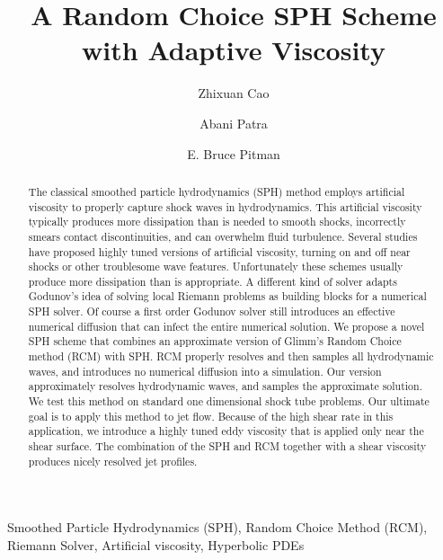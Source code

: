 \documentclass[review]{elsarticle}
\begin{document}
\begin{frontmatter}
\title{A Random Choice SPH Scheme with Adaptive Viscosity}
\author{Zhixuan Cao}
\author{Abani Patra }
\address{Department of Mechanical and Aerospace Engineering,The State University of New York at Buffalo, Amherst, NY, 14260-4200, USA}
\author{E. Bruce Pitman}
\address{Department of Materials Design and Innovation, The State University of New York at Buffalo, Amherst, NY, 14260-4200, USA}

\begin{abstract}
The classical smoothed particle hydrodynamics (SPH) method
employs artificial viscosity to properly capture shock waves in hydrodynamics. This artificial viscosity typically
produces more dissipation than is needed to smooth shocks, incorrectly  smears 
contact discontinuities, and can overwhelm fluid turbulence. 
Several studies have proposed highly tuned versions of artificial viscosity,
turning on and off near shocks or other troublesome wave features. 
Unfortunately these schemes usually produce more dissipation than is appropriate.
A different kind of solver adapts Godunov\rq{}s idea of solving local Riemann problems 
as building blocks for a numerical SPH solver. Of course a first order Godunov solver still introduces an effective numerical diffusion that can infect the entire numerical solution.
We propose a novel SPH scheme that combines an approximate
 version of Glimm\rq{}s Random Choice method (RCM)
with SPH. RCM properly resolves and then samples all hydrodynamic waves, and
introduces no numerical diffusion into a simulation. Our version approximately resolves
hydrodynamic waves, and samples the approximate solution.
We test this method on standard one dimensional shock tube problems.
Our ultimate goal is to apply this method to jet flow. Because of the high shear rate
in this application, we introduce a highly tuned eddy viscosity that is applied only near 
the shear surface.  The combination of the SPH and RCM together with a shear viscosity
produces nicely resolved jet profiles.

\end{abstract}
\begin{keyword}
Smoothed Particle Hydrodynamics (SPH), Random Choice Method (RCM), Riemann Solver, Artificial viscosity, Hyperbolic PDEs
\end{keyword}
\end{frontmatter}
\end{document}
